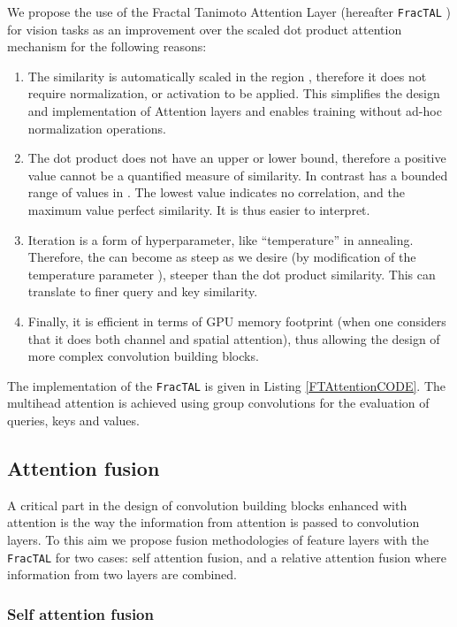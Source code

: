 \documentclass[times, 5p]{elsarticle}
\def \FracTAL {\texttt{FracTAL} }
\begin{document}
We propose the use of the Fractal Tanimoto Attention Layer (hereafter \FracTAL) for vision tasks as an improvement over the scaled dot product attention mechanism  \citep{DBLP:journals/corr/VaswaniSPUJGKP17}  for the following reasons:
\begin{enumerate}
\item The  similarity is automatically scaled in the region , therefore it does not require normalization, or activation to be applied. This simplifies  the design and implementation of Attention layers and enables training without ad-hoc normalization operations.   
\item The dot product does not have an upper or lower bound, therefore a positive value cannot be a quantified measure of similarity. In contrast  has a bounded range of values in . The lowest value indicates no correlation, and the maximum value perfect similarity. It is thus easier to interpret.  
\item Iteration  is a form of hyperparameter, like ``temperature'' in annealing.  Therefore, the  can become as steep as we desire (by modification of the temperature parameter ), steeper than the dot product similarity. This can translate to finer query and key similarity.
\item Finally, it is efficient in terms of GPU memory footprint (when one considers that it does both channel and spatial attention), thus allowing the design of more complex convolution building blocks.  
\end{enumerate}
The implementation of the \FracTAL is given in Listing \ref{FTAttentionCODE}. The multihead attention is achieved using group convolutions for the evaluation of queries, keys and values. 

\subsection{Attention fusion}

A critical part in the design of convolution building blocks enhanced with attention is the way the information from attention is passed to convolution layers. To this aim
we propose fusion methodologies of feature layers with the \texttt{FracTAL} for two cases:  self attention fusion, and a relative attention fusion where information from two layers are combined. 

\subsubsection{Self attention fusion}
\label{fractal_resnet}
\end{document}
